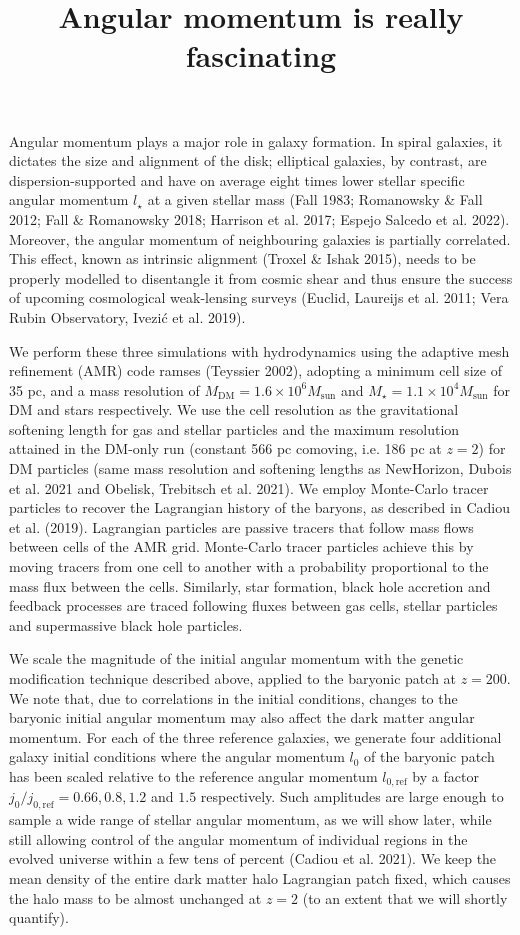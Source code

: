 \documentclass{article}
\title{Angular momentum is really fascinating}
\begin{document}
\maketitle

Angular momentum plays a major role in galaxy formation. In spiral
galaxies, it dictates the size and alignment of the disk; elliptical galaxies, by contrast, are dispersion-supported and have on average eight
times lower stellar specific angular momentum $l_\star$ at a given stellar mass (Fall 1983; Romanowsky \& Fall 2012; Fall \& Romanowsky
2018; Harrison et al. 2017; Espejo Salcedo et al. 2022). Moreover, the
angular momentum of neighbouring galaxies is partially correlated.
This effect, known as intrinsic alignment (Troxel \& Ishak 2015),
needs to be properly modelled to disentangle it from cosmic shear
and thus ensure the success of upcoming cosmological weak-lensing
surveys (Euclid, Laureijs et al. 2011; Vera Rubin Observatory, Ivezić
et al. 2019).

We perform these three simulations with hydrodynamics using
the adaptive mesh refinement (AMR) code ramses (Teyssier 2002),
adopting a minimum cell size of 35 pc, and a mass resolution of $M_\mathrm{DM} = 1.6 \times 10^6 M_\mathrm{sun}$ and $M_\star = 1.1 \times 10^4 M_\mathrm{sun}$ for DM and stars
respectively. We use the cell resolution as the gravitational softening
length for gas and stellar particles and the maximum resolution attained in the DM-only run (constant 566 pc comoving, i.e. 186 pc at
$z=2$) for DM particles (same mass resolution and softening lengths
as NewHorizon, Dubois et al. 2021 and Obelisk, Trebitsch et al.
2021). We employ Monte-Carlo tracer particles to recover the Lagrangian history of the baryons, as described in Cadiou et al. (2019).
Lagrangian particles are passive tracers that follow mass flows between cells of the AMR grid. Monte-Carlo tracer particles achieve this by moving tracers from one cell to another with a probability proportional to the mass flux between the cells. Similarly, star formation, black hole accretion and feedback processes are traced following
fluxes between gas cells, stellar particles and supermassive black hole
particles.

We scale the magnitude of the initial angular momentum with
the genetic modification technique described above, applied to the
baryonic patch at $z = 200$. We note that, due to correlations in the
initial conditions, changes to the baryonic initial angular momentum
may also affect the dark matter angular momentum. For each of the
three reference galaxies, we generate four additional galaxy initial
conditions where the angular momentum $l_0$ of the baryonic patch
has been scaled relative to the reference angular momentum $l_{0,\mathrm{ref}}$ by a
factor $j_0/ j_{0,\mathrm{ref}} = 0.66, 0.8, 1.2$ and $1.5$ respectively. Such amplitudes
are large enough to sample a wide range of stellar angular momentum,
as we will show later, while still allowing control of the angular
momentum of individual regions in the evolved universe within a
few tens of percent (Cadiou et al. 2021). We keep the mean density
of the entire dark matter halo Lagrangian patch fixed, which causes
the halo mass to be almost unchanged at $z = 2$ (to an extent that we
will shortly quantify).
\end{document}
